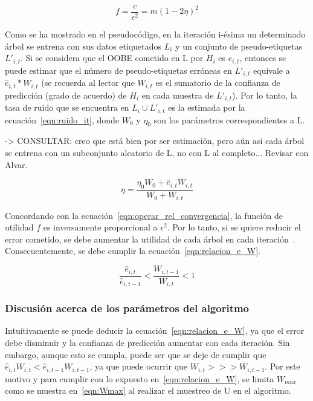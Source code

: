 \begin{equation}\label{eqn:operar_rel_convergencia} f = \frac{c}{\epsilon^{2}} = m(1-2\eta)^{2} \end{equation} 

Como se ha mostrado en el pseudocódigo, en la iteración i-ésima un determinado árbol se entrena con sus datos etiquetados $L_{i}$ y un conjunto de pseudo-etiquetas $L'_{i,t}$. Si se considera que el OOBE cometido en L por $H_{i}$ es $\hat{e}_{i,t}$, entonces se puede estimar que el número de pseudo-etiquetas erróneas en $L'_{i,t}$ equivale a $\hat{e}_{i,t} * W_{i,t}$ (se recuerda al lector que $W_{i,t}$ es el sumatorio de la confianza de predicción (grado de acuerdo) de $H_{i}$ en cada muestra de $L'_{i,t}$). Por lo tanto, la tasa de ruido que se encuentra en $L_{i} \cup L'_{i,t}$ es la estimada por la ecuación~\ref{eqn:ruido_it}, donde $W_0$ y $\eta_0$ son los parámetros correspondientes a L. 

-> CONSULTAR: creo que está bien por ser estimación, pero aún así cada árbol se entrena con un subconjunto aleatorio de L, no con L al completo... Revisar con Alvar.

\begin{equation}\label{eqn:ruido_it} \eta = \frac{\eta_{0}W_{0} + \hat{e}_{i,t}W_{i,t}}{W_{0} + W_{i,t}} \end{equation} 

Concordando con la ecuación~\ref{eqn:operar_rel_convergencia}, la función de utilidad $f$ es inversamente proporcional a $\epsilon^2$. Por lo tanto, si se quiere reducir el error cometido, se debe aumentar la utilidad de cada árbol en cada iteración~\cite{zhou2021SemisupervisedRecommendationAttack}. Consecuentemente, se debe cumplir la ecuación~\ref{eqn:relacion_e_W}. 

\begin{equation}\label{eqn:relacion_e_W} \frac{\hat{e}_{i,t}}{\widehat{e}_{i, t-1}} < \frac{W_{i,t-1}}{W_{i,t}} < 1 \end{equation} 


\subsubsection{Discusión acerca de los parámetros del algoritmo}

Intuitivamente se puede deducir la ecuación~\ref{eqn:relacion_e_W}, ya que el error debe disminuir y la confianza de predicción aumentar con cada iteración. Sin embargo, aunque esto se cumpla, puede ser que se deje de cumplir que $\hat{e}_{i,t}W_{i,t} < \hat{e}_{i,t-1}W_{i,t-1}$, ya que puede ocurrir que $ W_{i,t} >>> W_{i,t-1}$. Por este motivo y para cumplir con lo expuesto en~\ref{eqn:relacion_e_W}, se limita $W_{max}$ como se muestra en~\ref{eqn:Wmax} al realizar el muestreo de U en el algoritmo.

